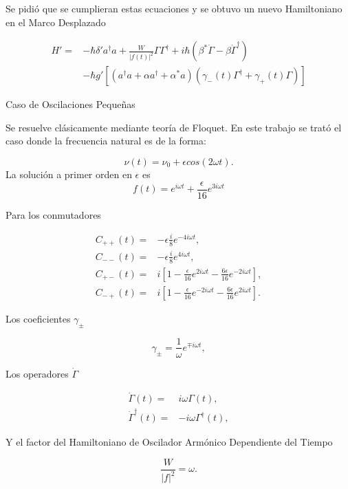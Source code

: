 \documentclass[10pt]{beamer}
\begin{document}
\begin{frame}
Se pidió que se cumplieran estas ecuaciones y se obtuvo un nuevo Hamiltoniano en el Marco Desplazado

\begin{align*}
H'=& \nonumber -\hbar \delta' a^\dagger a + \frac{W}{|f(t)|^2}\Gamma \Gamma^\dagger + i\hbar(\beta^*\dot{\Gamma} - \beta \dot{\Gamma}^\dagger) \\
&-\hbar g'[(a^{\dagger}a +\alpha a^{\dagger}+\alpha^* a)(\gamma_-(t)\Gamma^{\dagger}+\gamma_+(t)\Gamma)]
\end{align*}
\end{frame}

\begin{frame}{Caso de Oscilaciones Pequeñas}

Se resuelve clásicamente mediante teoría de Floquet. En este trabajo se trató el caso donde la frecuencia natural es de la forma:

\begin{equation*}
\nu(t) = \nu_0 + \epsilon cos(2\omega t).
\end{equation*} La solución a primer orden en $\epsilon$ es
\begin{equation*}
f(t)= e^{i\omega t} + \frac{\epsilon}{16} e^{3i\omega t}
\end{equation*}

\end{frame}


\begin{frame}
Para los conmutadores

\begin{align*}
C_{++}(t) =& -\epsilon\frac{i}{8}e^{-4i\omega t},\\
C_{--}(t) =& -\epsilon\frac{i}{8}e^{4i\omega t},\\
C_{+-}(t) =& i [1 -\frac{\epsilon}{16}e^{2i\omega t}-\frac{6\epsilon}{16}e^{-2i\omega t}],\\
C_{-+}(t) =& i [1 -\frac{\epsilon}{16}e^{-2i\omega t}-\frac{6\epsilon}{16}e^{2i\omega t}].
\end{align*}

\end{frame}

\begin{frame}
Los coeficientes $\gamma_\pm$

\begin{equation*}
\gamma_\pm= \frac{1}{\omega}e^{\mp i\omega t},
\end{equation*}

Los operadores $\dot{\Gamma}$

\begin{align*}
\dot{\Gamma}(t) =& i\omega \Gamma(t),\\
\dot{\Gamma}^\dagger(t) =& -i\omega \Gamma^\dagger(t),
\end{align*}

Y el factor del Hamiltoniano de Oscilador Armónico Dependiente del Tiempo

\begin{equation*}
\frac{W}{|f|^2} = \omega.
\end{equation*}

\end{frame}
\end{document}

